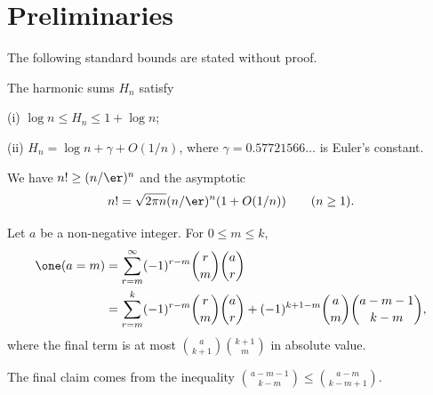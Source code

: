 \section{Preliminaries}

The following standard bounds are stated without proof.

\begin{lem}\label{harmonic}
The harmonic sums $H_n$ satisfy

(i) $\log n \le H_n \le 1 +\log n$;

(ii) $H_n = \log n + \gamma + O(1/n)$,
where
$\gamma=0.57721566\ldots$ is Euler's constant.
\end{lem}

\begin{lem}\label{Stirling}
We have $n! \ge (n/\er)^n$ and the asymptotic
\[
n! = \sqrt{2\pi n} (n/\er)^n (1+O(1/n)) \qquad (n\ge 1).
\]
\end{lem} 

\begin{lem}\label{incl-excl}
Let $a$ be a non-negative integer. For $0\le m\le k$,
\begin{align*}
\one(a=m) &= \sum_{r=m}^\infty (-1)^{r-m} \binom{r}{m} \binom{a}{r}
\\ &= \sum_{r=m}^k (-1)^{r-m} \binom{r}{m} \binom{a}{r} +
(-1)^{k+1-m} \binom{a}{m} \binom{a-m-1}{k-m},
\end{align*}
where the final term is
 at most $\binom{a}{k+1}\binom{k+1}{m}$ in
absolute value.
\end{lem}

The final claim comes from the inequality $\binom{a-m-1}{k-m} \le \binom{a-m}{k-m+1}$.
